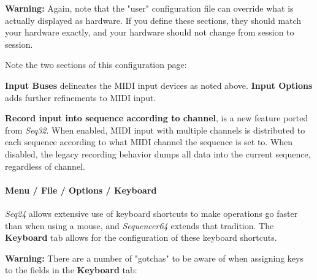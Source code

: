    \textbf{Warning:}
   Again, note that the "user" configuration file can override what is actually
   displayed as hardware.  If you define these sections, they should match your
   hardware exactly, and your hardware should not change from session to
   session.

   Note the two sections of this configuration page:

   \textbf{Input Buses} delineates the MIDI input devices as noted above.
   \textbf{Input Options} adds further refinements to MIDI input.

   \textbf{Record input into sequence according to channel},
   is a new feature ported from \textsl{Seq32}.
   When enabled, MIDI input with multiple channels is distributed to
   each sequence according to what MIDI channel the sequence is set to.
   When disabled, the legacy recording behavior dumps all data into the current
   sequence, regardless of channel.

\paragraph{Menu / File / Options / Keyboard }
\label{paragraph:seq64_menu_file_options_keyboard}

   \textsl{Seq24} allows extensive use of
   keyboard shortcuts to make operations go faster than when using a mouse,
   and \textsl{Sequencer64} extends that tradition.
   The \textbf{Keyboard} tab allows for the configuration of these keyboard
   shortcuts.

   \textbf{Warning:}
   There are a number of "gotchas" to be aware of when assigning keys to the
   fields in the \textbf{Keyboard} tab:

